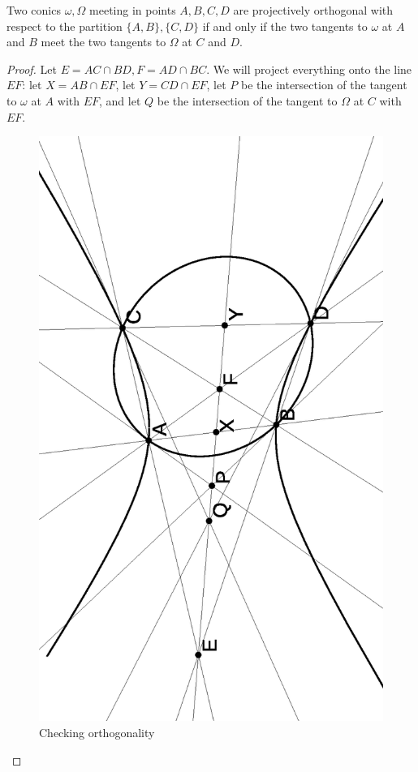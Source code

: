 \begin{thm} Two conics $\omega, \Omega$ meeting in points $A,B,C,D$ are projectively orthogonal with respect to the partition $\{A,B\},\{C,D\}$ if and only if the two tangents to $\omega$ at $A$ and $B$ meet the two tangents to $\Omega$ at $C$ and $D$.
\end{thm}
\begin{proof} Let $E = AC\cap BD, F = AD\cap BC$. We will project everything onto the line $EF$: let $X = AB\cap EF$, let $Y = CD\cap EF$, let $P$ be the intersection of the tangent to $\omega$ at $A$ with $EF$, and let $Q$ be the intersection of the tangent to $\Omega$ at $C$ with $EF$.

\begin{figure}[!htb]
\centering
\includegraphics[scale=0.5,angle=270]{north.eps}
\caption{Checking orthogonality}
\end{figure}


\end{proof}

